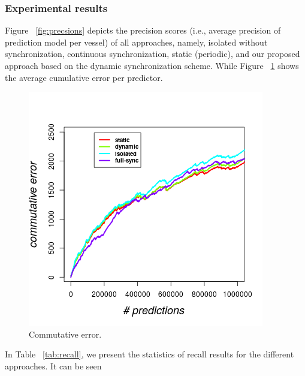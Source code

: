 \subsubsection*{Experimental results} Figure ~\ref{fig:precsions} depicts the precision scores (i.e., average precision of prediction model per vessel)  of all approaches, namely, isolated without synchronization, continuous synchronization, static (periodic), and our proposed approach based on the dynamic synchronization scheme. While Figure ~\ref{fig:error} shows the average cumulative error per predictor.       


\begin{figure}[]
	
	\includegraphics[width=.5\textwidth]{figures/error.png}
	
\caption{Commutative error.}
\label{fig:error}
\end{figure}

\par In Table ~\ref{tab:recall}, we present the statistics of recall results for the different approaches. It can be seen 


